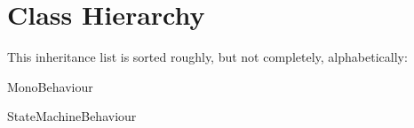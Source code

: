 \section{Class Hierarchy}
This inheritance list is sorted roughly, but not completely, alphabetically\+:\begin{DoxyCompactList}
\item Mono\+Behaviour\begin{DoxyCompactList}
\item {}
\item {}
\item {}
\end{DoxyCompactList}
\item State\+Machine\+Behaviour\begin{DoxyCompactList}
\item {}
\end{DoxyCompactList}
\end{DoxyCompactList}
